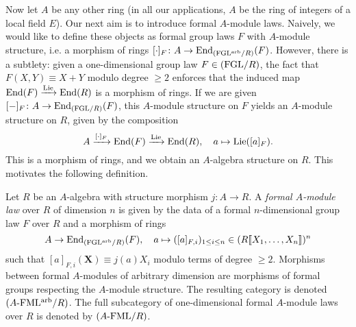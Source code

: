 \documentclass[../main.tex]{subfiles}
\begin{document}
Now let $A$ be any other ring (in all our applications, $A$ be the ring
of integers of a local field $E$). Our next aim is to introduce formal $A$-module
laws. Naively, we would like to define these objects as formal group laws $F$
with $A$-module structure, i.e. a morphism of rings $[\cdot]_F\colon A \to
\operatorname{End}_{(\mathrm{FGL^{arb}}/{R})}(F)$. However, there is a subtlety: given a one-dimensional
group law $F \in {(\mathrm{FGL}/{R})}$, the fact that $F(X,Y) \equiv X+Y$ modulo degree $\geq 2$
enforces that the induced map $\operatorname{End}(F) \xrightarrow{\operatorname{Lie}} \operatorname{End}(R)$ is a morphism of rings. 
If we are given $[-]_F\colon  A \to \operatorname{End}_{{(\mathrm{FGL}/{R})}}(F)$, this $A$-module structure on $F$ 
yields an $A$-module structure on $R$, given by the composition
\begin{equation*}
  A \xrightarrow{[\cdot]_F} \operatorname{End}(F) \xrightarrow{\operatorname{Lie}} \operatorname{End}(R), \quad a \mapsto \operatorname{Lie}([a]_F).
\end{equation*}
This is a morphism of rings, and we obtain an $A$-algebra structure on $R$. 
This motivates the following definition.
\begin{defi}\label{def:formalmodulelaw}
  Let $R$ be an $A$-algebra with structure morphism $j\colon  A \to R$. A \emph{formal
  $A$-module law} over $R$ of dimension $n$ is given by the data of 
  a formal $n$-dimensional group law $F$ over $R$ and a morphism of rings
  \begin{equation*}
    A \to \operatorname{End}_{{(\mathrm{FGL^{arb}}/{R})}} (F), \quad a \mapsto ([a]_{F,i}
    )_{1 \leq i \leq n} \in (R \llbracket X_1, \dots, X_n \rrbracket )^n
  \end{equation*}
  such that $[a]_{F,i}(\mathbf X) \equiv j(a) X_i$ modulo terms of degree 
  $\geq 2$. Morphisms between formal $A$-modules of arbitrary dimension are 
  morphisms of formal groups respecting the $A$-module structure. 
  The resulting category is denoted ${({A}\textnormal-\allowbreak\mathrm{FML^{arb}}/{R})}$. The full
  subcategory of one-dimensional formal $A$-module laws over $R$ is denoted by ${({A}\textnormal-\allowbreak\mathrm{FML}/{R})}$.
\end{defi}
\end{document}
